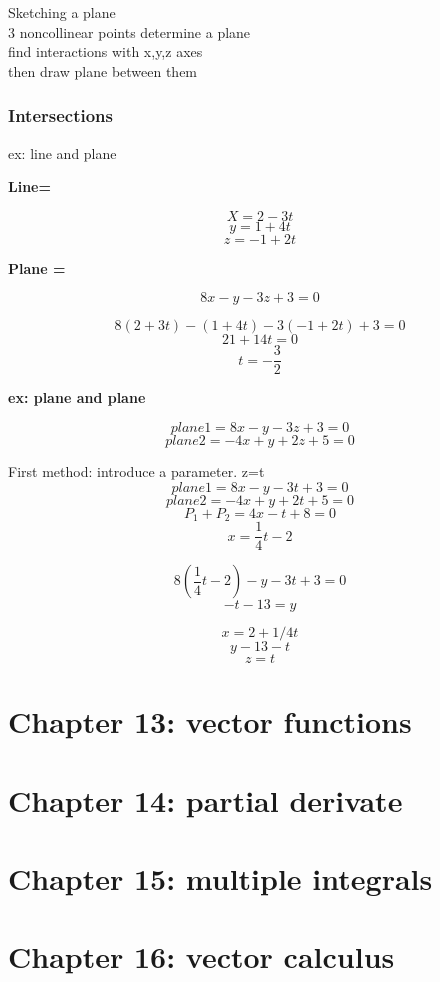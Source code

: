 \documentclass{article}
\begin{document}
Sketching a plane\\
3 noncollinear points determine a plane \\
find interactions with x,y,z axes \\
then draw plane between them \\

\subsubsection{Intersections}

ex: line and plane 

\begin{center}
    \noindent \textbf{\large Line=}
\end{center}
\[X =2 -3t\]
\[y=1+4t\]
\[z=-1+2t\]

\begin{center}
    \noindent \textbf{\large Plane = }
\end{center}
\[8x -y -3z+3=0\]

\[8(2+3t) -(1+4t) -3(-1+2t) +3=0\]
\[21+14t=0\]
\[t=-\frac{3}{2}\]
\linebreak
\begin{center}
    \noindent \textbf{\large ex: plane and plane}
\end{center}
\[plane 1 = 8x-y-3z+3 = 0\]
\[plane 2 = -4x+y+2z+5 = 0\]

First method: introduce a parameter. z=t
\[plane 1 = 8x-y-3t+3 = 0\]
\[plane 2 = -4x+y+2t+5 = 0\]
\[P_1+P_2 = 4x -t +8 =0\]
\[x=\frac{1}{4}t-2\]

\[8(\frac{1}{4}t-2)-y-3t+3 = 0\]
\[-t-13=y\]

\[x=2+1/4t\]
\[y-13-t\]
\[z=t\]


\section{Chapter 13: vector functions}

\section{Chapter 14: partial derivate}

\section{Chapter 15: multiple integrals}

\section{Chapter 16: vector calculus}
\end{document}
